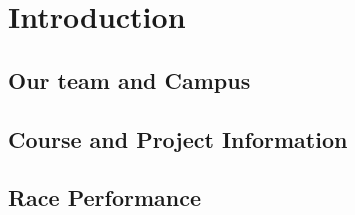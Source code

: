 \section{Introduction}

\subsection{Our team and Campus}

\subsection{Course and Project Information}

\subsection{Race Performance}
